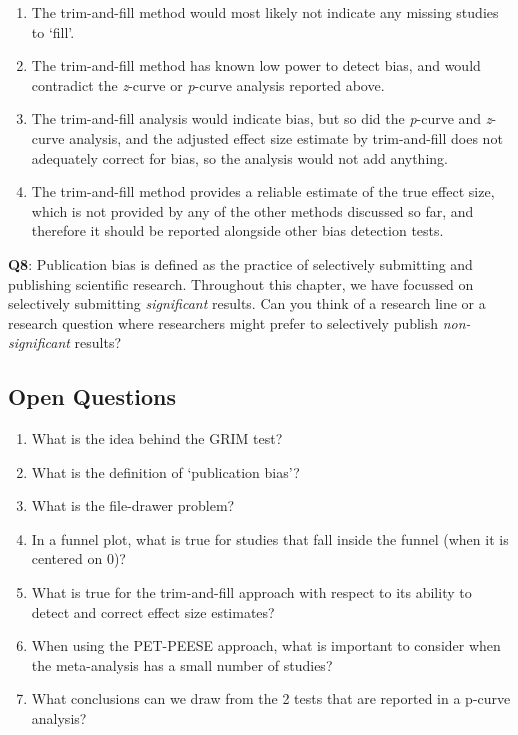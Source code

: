 \documentclass[
  oneside]{krantz}
\providecommand{\tightlist}{%
  \setlength{\itemsep}{0pt}\setlength{\parskip}{0pt}}
\begin{document}
\begin{enumerate}
\def\labelenumi{\Alph{enumi})}
\tightlist
\item
  The trim-and-fill method would most likely not indicate any missing studies to `fill'.
\item
  The trim-and-fill method has known low power to detect bias, and would contradict the \emph{z}-curve or \emph{p}-curve analysis reported above.
\item
  The trim-and-fill analysis would indicate bias, but so did the \emph{p}-curve and \emph{z}-curve analysis, and the adjusted effect size estimate by trim-and-fill does not adequately correct for bias, so the analysis would not add anything.
\item
  The trim-and-fill method provides a reliable estimate of the true effect size, which is not provided by any of the other methods discussed so far, and therefore it should be reported alongside other bias detection tests.
\end{enumerate}

\textbf{Q8}: Publication bias is defined as the practice of selectively submitting and publishing scientific research. Throughout this chapter, we have focussed on selectively submitting \emph{significant} results. Can you think of a research line or a research question where researchers might prefer to selectively publish \emph{non-significant} results?

\hypertarget{open-questions-10}{%
\subsection{Open Questions}\label{open-questions-10}}

\begin{enumerate}
\def\labelenumi{\arabic{enumi}.}
\item
  What is the idea behind the GRIM test?
\item
  What is the definition of `publication bias'?
\item
  What is the file-drawer problem?
\item
  In a funnel plot, what is true for studies that fall inside the funnel (when it is centered on 0)?
\item
  What is true for the trim-and-fill approach with respect to its ability to detect and correct effect size estimates?
\item
  When using the PET-PEESE approach, what is important to consider when the meta-analysis has a small number of studies?
\item
  What conclusions can we draw from the 2 tests that are reported in a p-curve analysis?
\end{enumerate}
\end{document}
